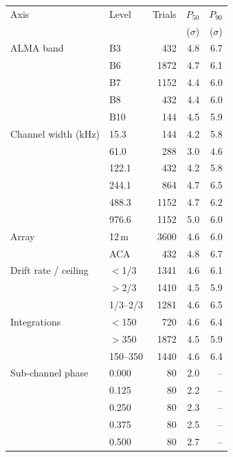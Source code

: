 \begin{tabular}{llrrr}
\hline
Axis & Level & Trials & $P_{50}$ & $P_{90}$ \\
 & & & ($\sigma$) & ($\sigma$) \\
\hline
ALMA band & B3 & 432 & 4.8 & 6.7 \\
 & B6 & 1872 & 4.7 & 6.1 \\
 & B7 & 1152 & 4.4 & 6.0 \\
 & B8 & 432 & 4.4 & 6.0 \\
 & B10 & 144 & 4.5 & 5.9 \\
\hline
Channel width (kHz) & 15.3 & 144 & 4.2 & 5.8 \\
 & 61.0 & 288 & 3.0 & 4.6 \\
 & 122.1 & 432 & 4.2 & 5.8 \\
 & 244.1 & 864 & 4.7 & 6.5 \\
 & 488.3 & 1152 & 4.7 & 6.2 \\
 & 976.6 & 1152 & 5.0 & 6.0 \\
\hline
Array & 12\,m & 3600 & 4.6 & 6.0 \\
 & ACA & 432 & 4.8 & 6.7 \\
\hline
Drift rate / ceiling & $<$1/3 & 1341 & 4.6 & 6.1 \\
 & $>$2/3 & 1410 & 4.5 & 5.9 \\
 & 1/3--2/3 & 1281 & 4.6 & 6.5 \\
\hline
Integrations & $<$150 & 720 & 4.6 & 6.4 \\
 & $>$350 & 1872 & 4.5 & 5.9 \\
 & 150--350 & 1440 & 4.6 & 6.4 \\
\hline
Sub-channel phase & 0.000 & 80 & 2.0 & -- \\
 & 0.125 & 80 & 2.2 & -- \\
 & 0.250 & 80 & 2.3 & -- \\
 & 0.375 & 80 & 2.5 & -- \\
 & 0.500 & 80 & 2.7 & -- \\
\hline
\end{tabular}
